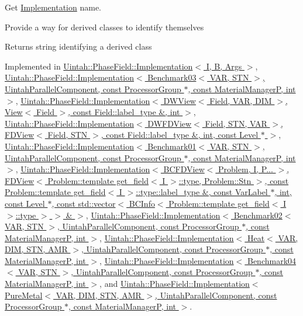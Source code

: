 Get \hyperlink{classUintah_1_1PhaseField_1_1Implementation}{Implementation} name. 

Provide a way for derived classes to identify themselves

\begin{DoxyReturn}{Returns}
string identifying a derived class 
\end{DoxyReturn}


Implemented in \hyperlink{classUintah_1_1PhaseField_1_1Implementation_a115940ce50afb4e7a2a0a831a2a6577c}{Uintah\+::\+Phase\+Field\+::\+Implementation$<$ I, B, Args $>$}, \hyperlink{classUintah_1_1PhaseField_1_1Implementation_a115940ce50afb4e7a2a0a831a2a6577c}{Uintah\+::\+Phase\+Field\+::\+Implementation$<$ Benchmark03$<$ V\+A\+R, S\+T\+N $>$, Uintah\+Parallel\+Component, const Processor\+Group $\ast$, const Material\+Manager\+P, int $>$}, \hyperlink{classUintah_1_1PhaseField_1_1Implementation_a115940ce50afb4e7a2a0a831a2a6577c}{Uintah\+::\+Phase\+Field\+::\+Implementation$<$ D\+W\+View$<$ Field, V\+A\+R, D\+I\+M $>$, View$<$ Field $>$, const Field\+::label\+\_\+type \&, int $>$}, \hyperlink{classUintah_1_1PhaseField_1_1Implementation_a115940ce50afb4e7a2a0a831a2a6577c}{Uintah\+::\+Phase\+Field\+::\+Implementation$<$ D\+W\+F\+D\+View$<$ Field, S\+T\+N, V\+A\+R $>$, F\+D\+View$<$ Field, S\+T\+N $>$, const Field\+::label\+\_\+type \&, int, const Level $\ast$ $>$}, \hyperlink{classUintah_1_1PhaseField_1_1Implementation_a115940ce50afb4e7a2a0a831a2a6577c}{Uintah\+::\+Phase\+Field\+::\+Implementation$<$ Benchmark01$<$ V\+A\+R, S\+T\+N $>$, Uintah\+Parallel\+Component, const Processor\+Group $\ast$, const Material\+Manager\+P, int $>$}, \hyperlink{classUintah_1_1PhaseField_1_1Implementation_a115940ce50afb4e7a2a0a831a2a6577c}{Uintah\+::\+Phase\+Field\+::\+Implementation$<$ B\+C\+F\+D\+View$<$ Problem, I, P... $>$, F\+D\+View$<$ Problem\+::template get\+\_\+field$<$ I $>$\+::type, Problem\+::\+Stn $>$, const Problem\+::template get\+\_\+field$<$ I $>$\+::type\+::label\+\_\+type \&, const Var\+Label $\ast$, int, const Level $\ast$, const std\+::vector$<$ B\+C\+Info$<$ Problem\+::template get\+\_\+field$<$ I $>$\+::type $>$ $>$ \& $>$}, \hyperlink{classUintah_1_1PhaseField_1_1Implementation_a115940ce50afb4e7a2a0a831a2a6577c}{Uintah\+::\+Phase\+Field\+::\+Implementation$<$ Benchmark02$<$ V\+A\+R, S\+T\+N $>$, Uintah\+Parallel\+Component, const Processor\+Group $\ast$, const Material\+Manager\+P, int $>$}, \hyperlink{classUintah_1_1PhaseField_1_1Implementation_a115940ce50afb4e7a2a0a831a2a6577c}{Uintah\+::\+Phase\+Field\+::\+Implementation$<$ Heat$<$ V\+A\+R, D\+I\+M, S\+T\+N, A\+M\+R $>$, Uintah\+Parallel\+Component, const Processor\+Group $\ast$, const Material\+Manager\+P, int $>$}, \hyperlink{classUintah_1_1PhaseField_1_1Implementation_a115940ce50afb4e7a2a0a831a2a6577c}{Uintah\+::\+Phase\+Field\+::\+Implementation$<$ Benchmark04$<$ V\+A\+R, S\+T\+N $>$, Uintah\+Parallel\+Component, const Processor\+Group $\ast$, const Material\+Manager\+P, int $>$}, and \hyperlink{classUintah_1_1PhaseField_1_1Implementation_a115940ce50afb4e7a2a0a831a2a6577c}{Uintah\+::\+Phase\+Field\+::\+Implementation$<$ Pure\+Metal$<$ V\+A\+R, D\+I\+M, S\+T\+N, A\+M\+R $>$, Uintah\+Parallel\+Component, const Processor\+Group $\ast$, const Material\+Manager\+P, int $>$}.

